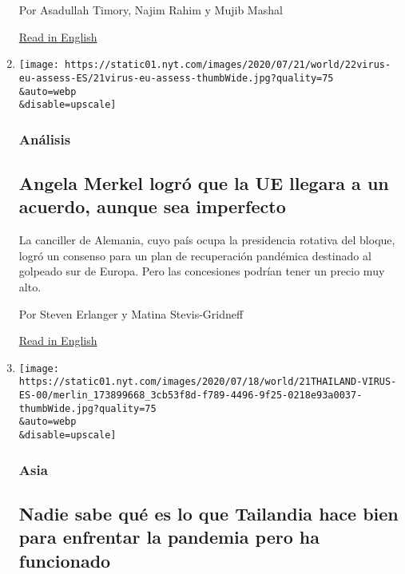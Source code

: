 \begin{enumerate}
  Por Asadullah Timory, Najim Rahim y Mujib Mashal

  \href{https://www.nytimes.com/2020/07/22/world/asia/afghan-hero-woman-taliban.html}{Read
  in English}
\item
  \href{/es/2020/07/22/espanol/mundo/coronavirus-union-europea-estimulo.html}{}

  \texttt{[image: https://static01.nyt.com/images/2020/07/21/world/22virus-eu-assess-ES/21virus-eu-assess-thumbWide.jpg?quality=75\\\&auto=webp\\\&disable=upscale]}

  \hypertarget{anuxe1lisis}{%
  \subsubsection{Análisis}\label{anuxe1lisis}}

  \hypertarget{angela-merkel-logruxf3-que-la-ue-llegara-a-un-acuerdo-aunque-sea-imperfecto}{%
  \subsection{Angela Merkel logró que la UE llegara a un acuerdo, aunque
  sea
  imperfecto}\label{angela-merkel-logruxf3-que-la-ue-llegara-a-un-acuerdo-aunque-sea-imperfecto}}

  La canciller de Alemania, cuyo país ocupa la presidencia rotativa del
  bloque, logró un consenso para un plan de recuperación pandémica
  destinado al golpeado sur de Europa. Pero las concesiones podrían
  tener un precio muy alto.

  Por Steven Erlanger y Matina Stevis-Gridneff

  \href{https://www.nytimes.com/2020/07/21/world/europe/european-union-coronavirus-aid.html}{Read
  in English}
\item
  \href{/es/2020/07/21/espanol/mundo/coronavirus-tailandia.html}{}

  \texttt{[image: https://static01.nyt.com/images/2020/07/18/world/21THAILAND-VIRUS-ES-00/merlin\_173899668\_3cb53f8d-f789-4496-9f25-0218e93a0037-thumbWide.jpg?quality=75\\\&auto=webp\\\&disable=upscale]}

  \hypertarget{asia-2}{%
  \subsubsection{Asia}\label{asia-2}}

  \hypertarget{nadie-sabe-quuxe9-es-lo-que-tailandia-hace-bien-para-enfrentar-la-pandemia-pero-ha-funcionado}{%
  \subsection{Nadie sabe qué es lo que Tailandia hace bien para
  enfrentar la pandemia pero ha
  funcionado}\label{nadie-sabe-quuxe9-es-lo-que-tailandia-hace-bien-para-enfrentar-la-pandemia-pero-ha-funcionado}}


\end{enumerate}
